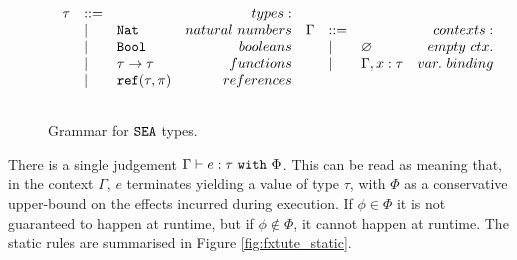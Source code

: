 \begin{figure}[h]

\[
\begin{array}{c}

\begin{array}{lllr}

\tau & ::= & ~ & types: \\
	& | & \mathtt{Nat} & natural~numbers \\
	& | & \mathtt{Bool} & booleans \\
	& | & \tau \rightarrow \tau & functions \\
	& | & \mathtt{ref}(\tau, \pi) & references \\
	&&\\

\end{array}

\begin{array}{lllr}
	
\Gamma & ::= & ~ & contexts: \\
	& | & \varnothing & empty~ctx. \\
	& | & \Gamma, x: \tau & var.~binding \\
	&&\\
\end{array}

\end{array}
\]

\vspace{-12pt}
\caption{Grammar for $\mathtt{SEA}$ types.}
\label{fig:fxtute_types}
\end{figure}

There is a single judgement $\Gamma \vdash e: \tau~\mathtt{with}~ \Phi$. This can be read as meaning that, in the context $\Gamma$, $e$ terminates yielding a value of type $\tau$, with $\Phi$ as a conservative upper-bound on the effects incurred during execution. If $\phi \in \Phi$ it is not guaranteed to happen at runtime, but if $\phi \notin \Phi$, it cannot happen at runtime. The static rules are summarised in Figure \ref{fig:fxtute_static}.

